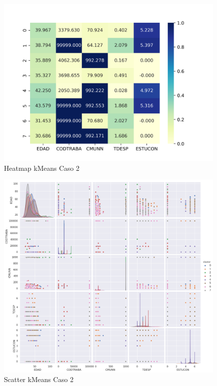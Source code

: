 \begin{figure}[H] %
	\centering
	\includegraphics[scale=0.65]{heatmap-km-2.png}  %
	\caption{Heatmap kMeans Caso 2} 
	\label{fig:hm-km-caso2}
\end{figure}

\begin{figure}[H] %
	\centering
	\includegraphics[scale=0.4]{kmeans-2.png}  %
	\caption{Scatter kMeans Caso 2} 
	\label{fig:sc-km-caso2}
\end{figure}

